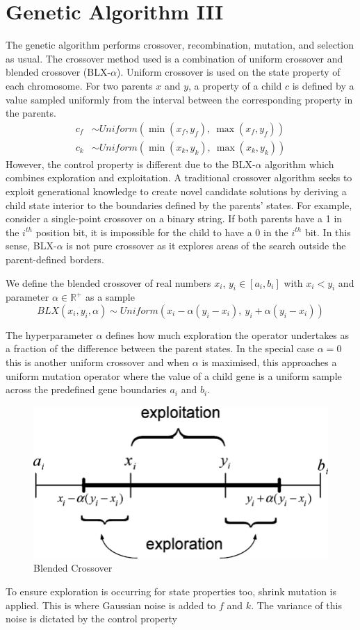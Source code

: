 
\section{Genetic Algorithm III}
The genetic algorithm performs crossover, recombination, mutation, and selection as usual. The crossover method used is a combination of uniform crossover and blended crossover (BLX-$\alpha$). Uniform crossover is used on the state property of each chromosome. For two parents $x$ and $y$, a property of a child $c$ is defined by a value sampled uniformly from the interval between the corresponding property in the parents.
\begin{align*}
  c_f &\sim \mathit{Uniform}(\min(x_f, y_f),\ \max(x_f, y_f))\\
  c_k &\sim \mathit{Uniform}(\min(x_k, y_k),\ \max(x_k, y_k))
\end{align*}
However, the control property is different due to the BLX-$\alpha$ algorithm which combines exploration and exploitation. A traditional crossover algorithm seeks to exploit generational knowledge to create novel candidate solutions by deriving a child state interior to the boundaries defined by the parents' states. For example, consider a single-point crossover on a binary string. If both parents have a 1 in the $i^{th}$ position bit, it is impossible for the child to have a 0 in the $i^{th}$ bit. In this sense, BLX-$\alpha$ is not pure crossover as it explores areas of the search outside the parent-defined borders.

\begin{definition}
We define the blended crossover of real numbers $x_i$, $y_i \in [a_i, b_i]$ with $x_i < y_i$ and parameter $\alpha \in \mathbb{R^+}$ as a sample\\
\[
  BLX(x_i, y_i, \alpha) \sim \mathit{Uniform}(x_i - \alpha(y_i - x_i),\  y_i + \alpha(y_i - x_i))
\]
\end{definition}
The hyperparameter $\alpha$ defines how much exploration the operator undertakes as a fraction of the difference between the parent states. In the special case $\alpha = 0$ this is another uniform crossover and when $\alpha$ is maximised, this approaches a uniform mutation operator where the value of a child gene is a uniform sample across the predefined gene boundaries $a_i$ and $b_i$.\\

\begin{figure}[!h]
\centering
    \includegraphics[width=.5\textwidth]{images/blx.png}
    \caption{Blended Crossover \cite{abido2006multiobjective}}
\label{fig:blx-alpha}
\end{figure}

To ensure exploration is occurring for state properties too, shrink mutation is applied. This is where Gaussian noise is added to $f$ and $k$. The variance of this noise is dictated by the control property 